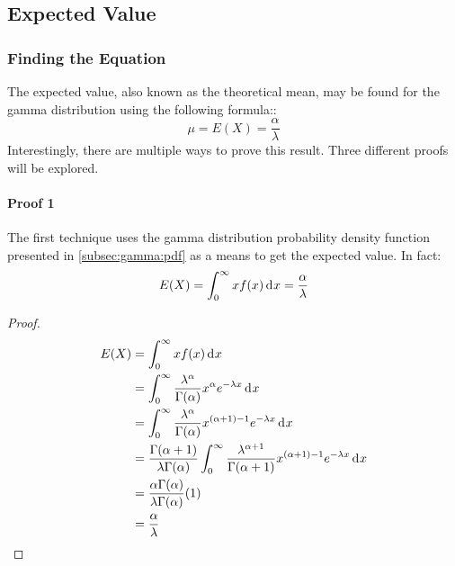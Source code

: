 \documentclass[12pt]{article}
\begin{document}
\pagebreak
\subsection{Expected Value}\label{subsec:gamma:expected}
\subsubsection{Finding the Equation}
The expected value, also known as the theoretical mean, may be found for the gamma distribution using the following
formula::
\begin{equation}
	\mu = E(X) = \frac{\alpha}{\lambda}
\end{equation}
Interestingly, there are multiple ways to prove this result. Three different proofs will be explored.

\paragraph{Proof 1}\label{par:gamma:expected:proof1}
The first technique uses the gamma distribution probability density function presented in \autoref{subsec:gamma:pdf} as
a means to get the expected value. In fact:
\begin{equation}\label{eq:gamma:expected:proof1}
	E(X) = \int^\infty_0 xf(x)\mathop{}\!\mathrm{d^{}}x = \frac{\alpha}{\lambda}
\end{equation}
\begin{proof}
	\begin{equation}
		\begin{split}
			E(X)	&=	\int^\infty_0 xf(x)\mathop{}\!\mathrm{d^{}}x\\
					&=	\int^\infty_0 \frac{\lambda^\alpha}{\Gamma(\alpha)}x^\alpha e^{-\lambda x}\mathop{}\!\mathrm{d^{}}x\\
					&=	\int^\infty_0 \frac{\lambda^\alpha}{\Gamma(\alpha)}x^{(\alpha+1)-1} e^{-\lambda x}\mathop{}\!\mathrm{d^{}}x\\
					&=	\frac{\Gamma(\alpha+1)}{\lambda\Gamma(\alpha)}\int^\infty_0 \frac{\lambda^{\alpha+1}}{\Gamma(\alpha+1)}x^{(\alpha+1)-1} e^{-\lambda x}\mathop{}\!\mathrm{d^{}}x\\
					&=	\frac{\alpha\Gamma(\alpha)}{\lambda\Gamma(\alpha)}(1)\\
					&=	\frac{\alpha}{\lambda}
		\end{split}
	\end{equation}
\end{proof}
\end{document}
